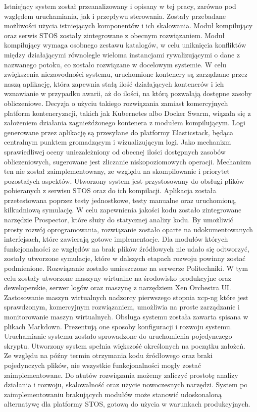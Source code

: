 Istniejący system został przeanalizowany i opisany w tej pracy, zarówno pod względem uruchamiania, jak i przepływu sterowania. Zostały przebadane możliwości użycia istniejących komponentów i ich skalowania. Moduł kompilujący oraz serwis STOS zostały zintegrowane z obecnym rozwiązaniem. Moduł kompilujący wymaga osobnego zestawu katalogów, w celu uniknięcia konfliktów między działającymi równolegle wieloma instancjami rywalizującymi o dane z nazwanego potoku, co zostało rozwiązane w docelowym systemie.
\newline \indent W celu zwiększenia niezawodności systemu, uruchomione kontenery są zarządzane przez naszą aplikację, która zapewnia stałą ilość działających kontenerów i ich wznawianie w przypadku awarii, aż do ilości, na którą pozwalają dostępne zasoby obliczeniowe. Decyzja o użyciu takiego rozwiązania zamiast komercyjnych platform konteneryzacji, takich jak Kubernetes albo Docker Swarm, wiązała się z założeniem działania zagnieżdżonego kontenera z modułem kompilującym. Logi generowane przez aplikację są przesyłane do platformy Elasticstack, będąca centralnym punktem gromadzącym i wizualizującym logi. Jako mechanizm sprawiedliwej oceny uniezależniony od obecnej ilości dostępnych zasobów obliczeniowych, sugerowane jest zliczanie niskopoziomowych operacji. Mechanizm ten nie został zaimplementowany, ze względu na skompilowanie i priorytet pozostałych aspektów.
\newline \indent Utworzony system jest przystosowany do obsługi plików pobieranych z serwisu STOS oraz do ich kompilacji. Aplikacja została przetestowana poprzez testy jednostkowe, testy manualne oraz uruchomioną, kilkudniową symulację. W celu zapewnienia jakości kodu zostało zintegrowane narzędzie Prospector, które służy do statycznej analizy kodu. By umożliwić prosty rozwój oprogramowania, rozwiązanie zostało oparte na udokumentowanych interfejsach, które zawierają gotowe implementacje. Dla modułów których funkcjonalności ze względów na brak plików źródłowych nie udało się odtworzyć, zostały utworzone symulacje, które w dalszych etapach rozwoju powinny zostać podmienione.
\newline \indent Rozwiązanie zostało umieszczone na serwerze Politechniki. W tym celu zostały utworzone maszyny wirtualne na środowisko produkcyjne oraz deweloperskie, serwer logów oraz maszynę z narzędziem Xen Orchestra UI. Zastosowanie maszyn wirtualnych nadzorcy pierwszego stopnia xcp-ng które jest sprawdzonym, komercyjnym rozwiązaniem, umożliwia na proste zarządzanie i monitorowanie maszyn wirtualnych.
\newline \indent Obsługa systemu została zawarta spisana w plikach Markdown. Prezentują one sposoby konfiguracji i rozwoju systemu. Uruchamianie systemu zostało sprowadzone do uruchomienia pojedynczego skryptu.
\newline \indent Utworzony system spełnia większość określonych na początku założeń. Ze względu na późny termin otrzymania kodu źródłowego oraz braki pojedynczych plików, nie wszystkie funkcjonalności mogły zostać zaimplementowane. Do atutów rozwiązania możemy zaliczyć prostotę analizy działania i rozwoju, skalowalność oraz użycie nowoczesnych narzędzi. System po zaimplementowaniu brakujących modułów może stanowić udoskonaloną alternatywę dla platformy STOS, gotową do użycia w warunkach produkcyjnych.
